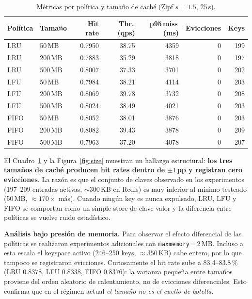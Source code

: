 \documentclass[11pt,a4paper]{article}
\begin{document}
\begin{table}[h]
\centering\small
\begin{tabular}{llrrrrr}
\toprule
\textbf{Política} & \textbf{Tamaño} & \textbf{Hit rate} & \textbf{Thr.\,(qps)} &
\textbf{p95\,miss\,(ms)} & \textbf{Evicciones} & \textbf{Keys} \\
\midrule
LRU  & 50\,MB  & 0.7950 & 38.75 & 4359 & 0 & 199 \\
LRU  & 200\,MB & 0.7883 & 35.29 & 3818 & 0 & 197 \\
LRU  & 500\,MB & 0.8007 & 37.33 & 3701 & 0 & 202 \\
LFU  & 50\,MB  & 0.7984 & 38.21 & 4114 & 0 & 203 \\
LFU  & 200\,MB & 0.8069 & 39.78 & 3732 & 0 & 208 \\
LFU  & 500\,MB & 0.8024 & 38.49 & 4021 & 0 & 203 \\
FIFO & 50\,MB  & 0.8052 & 38.01 & 3876 & 0 & 203 \\
FIFO & 200\,MB & 0.8082 & 39.43 & 3878 & 0 & 209 \\
FIFO & 500\,MB & 0.7963 & 37.20 & 4078 & 0 & 207 \\
\bottomrule
\end{tabular}
\caption{Métricas por política y tamaño de caché (Zipf $s{=}1.5$, 25\,s).}
\label{tab:size}
\end{table}

El Cuadro~\ref{tab:size} y la Figura~\ref{fig:size} muestran un hallazgo
estructural: \textbf{los tres tamaños de caché producen hit rates dentro de
$\pm 1$\,pp y registran cero evicciones}. La razón es que el conjunto de
claves observado en los experimentos (197--209 entradas activas, $\sim$300\,KB
en Redis) es muy inferior al mínimo testeado (50\,MB, $\approx 170\times$ más).
Cuando ningún key es nunca expulsado, LRU, LFU y FIFO se comportan como un
simple store de clave-valor y la diferencia entre políticas se vuelve ruido
estadístico.

\textbf{Análisis bajo presión de memoria.} Para observar el efecto
diferencial de las políticas se realizaron experimentos adicionales con
\texttt{maxmemory}\,=\,2\,MB. Incluso a esta escala el keyspace activo
(246--250 keys, $\approx 350$\,KB) cabe entero, por lo que tampoco se
registraron evicciones. Curiosamente el hit rate sube a 83.4--83.8\,\% (LRU
0.8378, LFU 0.8338, FIFO 0.8376): la varianza pequeña entre tamaños
proviene del orden aleatorio de calentamiento, no de evicciones diferenciales.
Esto confirma que en el régimen actual \emph{el tamaño no es el cuello de
botella}.
\end{document}
